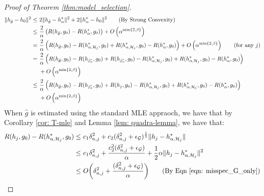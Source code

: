 \begin{proof}[Proof of Theorem \ref{thm:model_selection}]
\begin{align*}
    \|h_{\hat{\theta}} - h_0\|^2 \leq ~& 2\|h_{\hat{\theta}} - h_{\alpha}^*\|^2 + 2\|h_{\alpha}^*-h_0\|^2 \tag{By Strong Convexity}\\
    \leq~& \frac{2}{\alpha}\left(R(h_{\hat{\theta}},g_0) - R(h_{\alpha}^*,g_0)\right) + O\left(\alpha^{\min\{2,\beta\}}\right)\\
    =~& \frac{2}{\alpha}\left(R(h_{\hat{\theta}},g_0) -R(h_{\alpha,\mathcal{H}_j}^*,g_0) + R(h_{\alpha, \mathcal{H}_j}^*,g_0)-R(h_{\alpha}^*,g_0)\right) + O\left(\alpha^{\min\{2,\beta\}}\right)\tag{for any $j$}\\
    =~& \frac{2}{\alpha} \left(R(h_{\hat{\theta}},g_0) - R(h_{j_{\alpha}^*},g_0) + R(h_{j_{\alpha}^*},g_0) -R(h_{\alpha,\mathcal{H}_{j}}^*,g_0) + R(h_{\alpha, \mathcal{H}_{j}}^*,g_0)-R(h_{\alpha}^*,g_0)\right) \\
    ~&+O\left(\alpha^{\min\{2,\beta\}}\right)\\
    \leq ~&\frac{2}{\alpha} \left(R(h_{\hat{\theta}},g_0) - R(h_{j_{\alpha}^*},g_0) + R(h_{j},g_0) -R(h_{\alpha,\mathcal{H}_{j}}^*,g_0) + R(h_{\alpha, \mathcal{H}_{j}}^*,g_0)-R(h_{\alpha}^*,g_0)\right)\\
    ~&+O\left(\alpha^{\min\{2,\beta\}}\right)\\
\end{align*}
When $\hat{g}$ is estimated using the standard MLE appraoch, we have that by Corollary \ref{cor: T-mle} and Lemma \ref{lem: quadra-lemma}, we have that:
\begin{align*}
    R(h_{j},g_0) -R(h_{\alpha,\Hcal_{j}}^*,g_0) \leq~& c_1 \delta_{n,j}^2 + c_2 (\delta_{n,j}^2 + \epsilon_{\Gcal})^{\frac{1}{2}}\|h_j-h_{\alpha,\Hcal_{j}}^*\|\\
    \leq~& c_1 \delta_{n,j}^2 + \frac{c_2^2 (\delta_{n,j}^2 + \epsilon_{\Gcal})}{\alpha} + \frac{1}{2}\alpha \|h_j-h_{\alpha,\Hcal_{j}}^*\|^2\\
    \leq ~& O\bigg( \delta_{n,j}^2 + \frac{(\delta_{n,j}^2 + \epsilon_{\Gcal})}{\alpha}\bigg) \tag{By Eqn \ref{eqn: misspec_G_only}}
\end{align*}

\end{proof}
